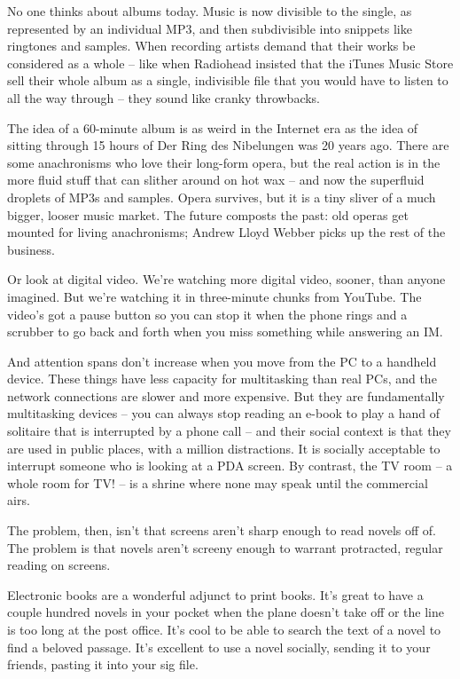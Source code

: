 No one thinks about albums today. Music is now divisible to the
single, as represented by an individual MP3, and then subdivisible
into snippets like ringtones and samples. When recording artists
demand that their works be considered as a whole -- like when
Radiohead insisted that the iTunes Music Store sell their whole
album as a single, indivisible file that you would have to listen
to all the way through -- they sound like cranky throwbacks.

The idea of a 60-minute album is as weird in the Internet era as
the idea of sitting through 15 hours of Der Ring des Nibelungen was
20 years ago. There are some anachronisms who love their long-form
opera, but the real action is in the more fluid stuff that can
slither around on hot wax -- and now the superfluid droplets of
MP3s and samples. Opera survives, but it is a tiny sliver of a much
bigger, looser music market. The future composts the past: old
operas get mounted for living anachronisms; Andrew Lloyd Webber
picks up the rest of the business.

Or look at digital video. We're watching more digital video,
sooner, than anyone imagined. But we're watching it in three-minute
chunks from YouTube. The video's got a pause button so you can stop
it when the phone rings and a scrubber to go back and forth when
you miss something while answering an IM.

And attention spans don't increase when you move from the PC to a
handheld device. These things have less capacity for multitasking
than real PCs, and the network connections are slower and more
expensive. But they are fundamentally multitasking devices -- you
can always stop reading an e-book to play a hand of solitaire that
is interrupted by a phone call -- and their social context is that
they are used in public places, with a million distractions. It is
socially acceptable to interrupt someone who is looking at a PDA
screen. By contrast, the TV room -- a whole room for TV! -- is a
shrine where none may speak until the commercial airs.

The problem, then, isn't that screens aren't sharp enough to read
novels off of. The problem is that novels aren't screeny enough to
warrant protracted, regular reading on screens.

Electronic books are a wonderful adjunct to print books. It's great
to have a couple hundred novels in your pocket when the plane
doesn't take off or the line is too long at the post office. It's
cool to be able to search the text of a novel to find a beloved
passage. It's excellent to use a novel socially, sending it to your
friends, pasting it into your sig file.

